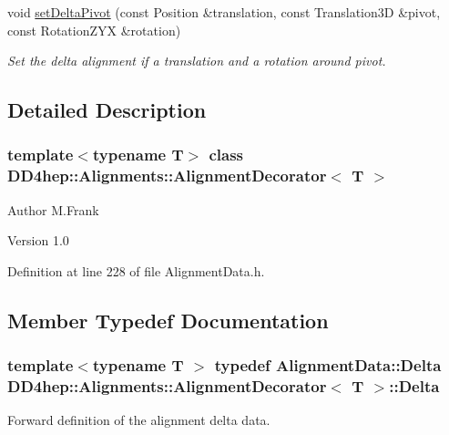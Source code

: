 \begin{DoxyCompactItemize}
void \hyperlink{class_d_d4hep_1_1_alignments_1_1_alignment_decorator_a5b84d2b352ba02e27815b66a94888999}{setDeltaPivot} (const Position \&translation, const Translation3D \&pivot, const RotationZYX \&rotation)
\begin{DoxyCompactList}\small\item\em Set the delta alignment if a translation and a rotation around pivot. \item\end{DoxyCompactList}\end{DoxyCompactItemize}


\subsection{Detailed Description}
\subsubsection*{template$<$typename T$>$ class DD4hep::Alignments::AlignmentDecorator$<$ T $>$}

\begin{DoxyAuthor}{Author}
M.Frank 
\end{DoxyAuthor}
\begin{DoxyVersion}{Version}
1.0 
\end{DoxyVersion}


Definition at line 228 of file AlignmentData.h.

\subsection{Member Typedef Documentation}
\hypertarget{class_d_d4hep_1_1_alignments_1_1_alignment_decorator_aafa729192cc27e7d36f6e9cfd3484289}{
\subsubsection[{Delta}]{\setlength{\rightskip}{0pt plus 5cm}template$<$typename T $>$ typedef {\bf AlignmentData::Delta} {\bf DD4hep::Alignments::AlignmentDecorator}$<$ {\bf T} $>$::{\bf Delta}}}
\label{class_d_d4hep_1_1_alignments_1_1_alignment_decorator_aafa729192cc27e7d36f6e9cfd3484289}


Forward definition of the alignment delta data. 

